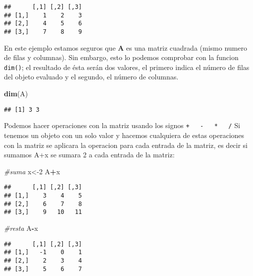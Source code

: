 \documentclass[
]{article}
\newenvironment{Shaded}{\begin{snugshade}}{\end{snugshade}}
\newcommand{\CommentTok}[1]{\textcolor[rgb]{0.56,0.35,0.01}{\textit{#1}}}
\newcommand{\DecValTok}[1]{\textcolor[rgb]{0.00,0.00,0.81}{#1}}
\newcommand{\KeywordTok}[1]{\textcolor[rgb]{0.13,0.29,0.53}{\textbf{#1}}}
\newcommand{\NormalTok}[1]{#1}
\newcommand{\OperatorTok}[1]{\textcolor[rgb]{0.81,0.36,0.00}{\textbf{#1}}}
\begin{document}
\begin{verbatim}
##      [,1] [,2] [,3]
## [1,]    1    2    3
## [2,]    4    5    6
## [3,]    7    8    9
\end{verbatim}

En este ejemplo estamos seguros que \textbf{A} es una matriz cuadrada
(mismo numero de filas y columnas). Sin embargo, esto lo podemos
comprobar con la funcion \texttt{dim()}; el resultado de ésta serán dos
valores, el primero indica el número de filas del objeto evaluado y el
segundo, el número de columnas.

\begin{Shaded}
\begin{Highlighting}[]
\KeywordTok{dim}\NormalTok{(A)}
\end{Highlighting}
\end{Shaded}

\begin{verbatim}
## [1] 3 3
\end{verbatim}

Podemos hacer operaciones con la matriz usando los signos
\texttt{+\ \ \ -\ \ \ *\ \ \ /} Si tenemos un objeto con un solo valor y
hacemos cualquiera de estas operaciones con la matriz se aplicara la
operacion para cada entrada de la matriz, es decir si sumamos A+x se
sumara 2 a cada entrada de la matriz:

\begin{Shaded}
\begin{Highlighting}[]
\CommentTok{\#suma}
\NormalTok{x\textless{}{-}}\DecValTok{2}
\NormalTok{A}\OperatorTok{+}\NormalTok{x}
\end{Highlighting}
\end{Shaded}

\begin{verbatim}
##      [,1] [,2] [,3]
## [1,]    3    4    5
## [2,]    6    7    8
## [3,]    9   10   11
\end{verbatim}

\begin{Shaded}
\begin{Highlighting}[]
\CommentTok{\#resta}
\NormalTok{A}\OperatorTok{{-}}\NormalTok{x}
\end{Highlighting}
\end{Shaded}

\begin{verbatim}
##      [,1] [,2] [,3]
## [1,]   -1    0    1
## [2,]    2    3    4
## [3,]    5    6    7
\end{verbatim}
\end{document}
